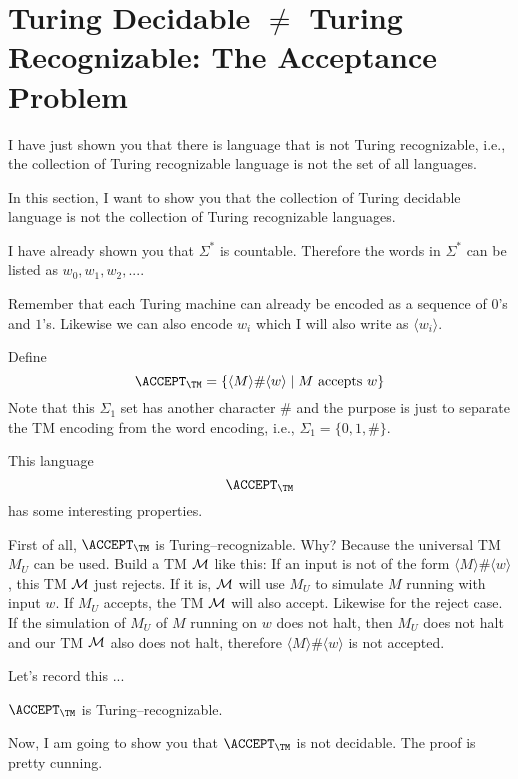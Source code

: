 \section{Turing Decidable $\neq$ 
Turing Recognizable:
The Acceptance Problem}

I have just shown you that there is language that is not
Turing recognizable, i.e., the 
collection of Turing recognizable language is not the 
set of all languages.

In this section, I want to show you
that the collection of Turing decidable language is not the 
collection of Turing recognizable languages.

I have already shown you that $\Sigma^*$ is countable.
Therefore the words in $\Sigma^*$ can be listed 
as $w_0, w_1, w_2, ...$.

Remember that each Turing machine can already be encoded as a
sequence of $0$'s and $1$'s.
Likewise we can also encode $w_i$ which I will also write
as $\langle w_i \rangle$.


Define
\[
\ACCEPT_\TM
= \{ \langle M \rangle \# \langle w \rangle \mid M \text{ accepts } w \}
\]
Note that this $\Sigma_1$ set has
another character $\#$ and the purpose is just to 
separate the TM encoding from the word encoding, i.e.,
$\Sigma_1 = \{0, 1, \#\}$.


This language 
\[
\ACCEPT_\TM
\]
has some interesting properties.

First of all,
$\ACCEPT_\TM$ 
is Turing--recognizable.
Why?
Because the universal TM $M_U$
can be used.
Build a TM $\cal M$
like this:
If an input is not of the form
$\langle M \rangle \# \langle w\rangle$,
this TM $\cal M$
just rejects.
If it is, $\cal M$
will use $M_U$ to simulate
$M$ running with input $w$.
If $M_U$ accepts, the TM $\cal M$ will also accept.
Likewise for the reject case.
If the simulation of $M_U$ of $M$ running on $w$
does not halt, then $M_U$ does not halt
and our TM $\cal M$ also does not halt,
therefore 
$\langle M \rangle \# \langle w\rangle$
is not accepted.

Let's record this ...

\begin{thm}
$\ACCEPT_\TM$
is Turing--recognizable.
\end{thm}

Now, I am going to show you that $\ACCEPT_\TM$ is not 
decidable.
The proof is pretty cunning.

